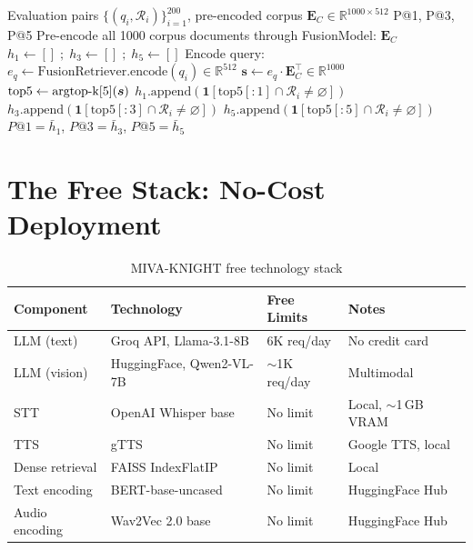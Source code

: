 \documentclass[12pt,a4paper]{article}
\theoremstyle{definition}
\theoremstyle{plain}
\theoremstyle{remark}
\newcommand{\R}{\mathbb{R}}
\newcommand{\argtopk}{\operatornamewithlimits{argtop\text{-}k}}
\begin{document}
\begin{algorithm}[H]
\caption{Ground-Truth Evaluation (P@K)}
\label{alg:eval}
\begin{algorithmic}[1]
\Require Evaluation pairs $\{(q_i, \mathcal{R}_i)\}_{i=1}^{200}$,
         pre-encoded corpus $\mathbf{E}_C \in \R^{1000\times512}$
\Ensure P@1, P@3, P@5
\State Pre-encode all 1000 corpus documents through FusionModel: $\mathbf{E}_C$
\State $h_1 \gets []\;;\; h_3 \gets []\;;\; h_5 \gets []$
  \State Encode query: $e_q \gets \text{FusionRetriever.encode}(q_i) \in \R^{512}$
  \State $\bm{s} \gets e_q \cdot \mathbf{E}_C^\top \in \R^{1000}$
  \State $\text{top5} \gets \argtopk[5](\bm{s})$
  \State $h_1.\text{append}(\mathbf{1}[\text{top5}[:1] \cap \mathcal{R}_i \ne \varnothing])$
  \State $h_3.\text{append}(\mathbf{1}[\text{top5}[:3] \cap \mathcal{R}_i \ne \varnothing])$
  \State $h_5.\text{append}(\mathbf{1}[\text{top5}[:5] \cap \mathcal{R}_i \ne \varnothing])$
\EndFor
\State \Return $P@1 = \bar{h}_1$,\; $P@3 = \bar{h}_3$,\; $P@5 = \bar{h}_5$
\end{algorithmic}
\end{algorithm}

\newpage
\section{The Free Stack: No-Cost Deployment}

\begin{table}[htbp]
\centering
\caption{MIVA-KNIGHT free technology stack}
\label{tab:stack}
\begin{tabular}{llll}
\toprule
Component & Technology & Free Limits & Notes \\
\midrule
LLM (text) & Groq API, Llama-3.1-8B & 6K req/day & No credit card \\
LLM (vision) & HuggingFace, Qwen2-VL-7B & $\sim$1K req/day & Multimodal \\
STT & OpenAI Whisper base & No limit & Local, $\sim$1\,GB VRAM \\
TTS & gTTS & No limit & Google TTS, local \\
Dense retrieval & FAISS IndexFlatIP & No limit & Local \\
Text encoding & BERT-base-uncased & No limit & HuggingFace Hub \\
Audio encoding & Wav2Vec 2.0 base & No limit & HuggingFace Hub \\
\bottomrule
\end{tabular}
\end{table}
\end{document}

